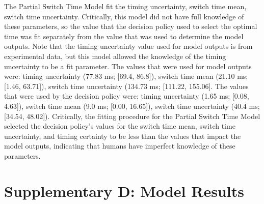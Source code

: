 \documentclass[man,floatsintext,letterpaper,12pt]{apa7}
\begin{document}
The Partial Switch Time Model fit the timing uncertainty, switch time mean, switch time uncertainty. Critically, this model did not have full knowledge of these parameters, so the value that the decision policy used to select the optimal time was fit separately from the value that was used to determine the model outputs. Note that the timing uncertainty value used for model outputs is from experimental data, but this model allowed the knowledge of the timing uncertainty to be a fit parameter. The values that were used for model outputs were: timing uncertainty (77.83 ms; [69.4, 86.8]), switch time mean (21.10 ms; [1.46, 63.71]), switch time uncertainty (134.73 ms; [111.22, 155.06]. The values that were used by the decision policy were: timing uncertainty (1.65 ms;  [0.08, 4.63]), switch time mean (9.0 ms; [0.00, 16.65]), switch time uncertainty (40.4 ms; [34.54, 48.02]). Critically, the fitting procedure for the Partial Switch Time Model selected the decision policy’s values for the switch time mean, switch time uncertainty, and timing certainty to be less than the values that impact the model outputs, indicating that  humans have imperfect knowledge of these parameters.

\newpage
\section{Supplementary D: Model Results}
\end{document}
